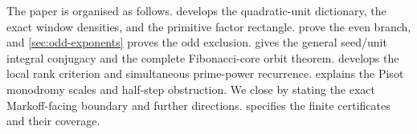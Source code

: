 The paper is organised as follows.  develops the
quadratic-unit dictionary, the exact window densities, and the primitive
factor rectangle.  prove the
even branch, and \cref{sec:odd-exponents} proves the odd exclusion.
 gives the general seed/unit integral conjugacy and the
complete Fibonacci-core orbit theorem.  develops the
local rank criterion and simultaneous prime-power recurrence.
 explains the Pisot monodromy scales and half-step
obstruction. We close by stating the exact Markoff-facing boundary and further
directions.
 specifies the finite certificates and their coverage.
